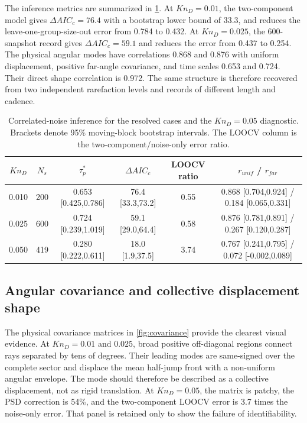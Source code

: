 \documentclass[paper]{JFM-FLM_Au}
\newcommand{\KnD}{Kn_D}
\begin{document}
The inference metrics are summarized in \cref{tab:inference}. At $\KnD=0.01$, the two-component model gives $\Delta AIC_c=76.4$ with a bootstrap lower bound of 33.3, and reduces the leave-one-group-size-out error from 0.784 to 0.432. At $\KnD=0.025$, the 600-snapshot record gives $\Delta AIC_c=59.1$ and reduces the error from 0.437 to 0.254. The physical angular modes have correlations 0.868 and 0.876 with uniform displacement, positive far-angle covariance, and time scales 0.653 and 0.724. Their direct shape correlation is 0.972. The same structure is therefore recovered from two independent rarefaction levels and records of different length and cadence.

\begin{table}
\centering
\caption{Correlated-noise inference for the resolved cases and the $\KnD=0.05$ diagnostic. Brackets denote 95\% moving-block bootstrap intervals. The LOOCV column is the two-component/noise-only error ratio.}
\label{tab:inference}
\small
\begin{tabular}{cccccc}
\toprule
$\KnD$ & $N_s$ & $\tau_p^*$ & $\Delta AIC_c$ & LOOCV ratio & $r_{unif}$ / $r_{far}$ \\
\midrule
0.010 & 200 & 0.653 [0.425,0.786] & 76.4 [33.3,73.2] & 0.55 & 0.868 [0.704,0.924] / 0.184 [0.065,0.331] \\
0.025 & 600 & 0.724 [0.239,1.019] & 59.1 [29.0,64.4] & 0.58 & 0.876 [0.781,0.891] / 0.267 [0.120,0.287] \\
0.050 & 419 & 0.280 [0.222,0.611] & 18.0 [1.9,37.5] & 3.74 & 0.767 [0.241,0.795] / 0.072 [-0.002,0.089] \\
\bottomrule
\end{tabular}
\end{table}

\subsection{Angular covariance and collective displacement shape}
The physical covariance matrices in \cref{fig:covariance} provide the clearest visual evidence. At $\KnD=0.01$ and $0.025$, broad positive off-diagonal regions connect rays separated by tens of degrees. Their leading modes are same-signed over the complete sector and displace the mean half-jump front with a non-uniform angular envelope. The mode should therefore be described as a collective displacement, not as rigid translation. At $\KnD=0.05$, the matrix is patchy, the PSD correction is 54\%, and the two-component LOOCV error is 3.7 times the noise-only error. That panel is retained only to show the failure of identifiability.
\end{document}
